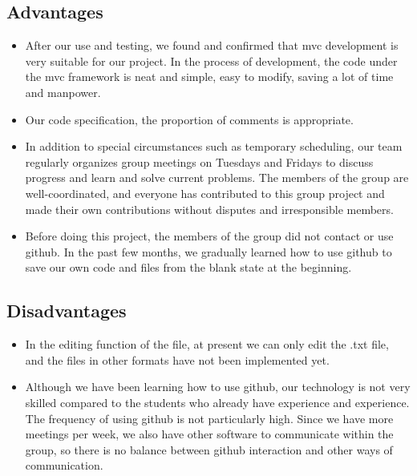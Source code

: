 \subsection{Advantages}
\begin{itemize}
    \item After our use and testing, we found and confirmed that mvc development is very suitable for our project. In the process of development, the code under the mvc framework is neat and simple, easy to modify, saving a lot of time and manpower.
    \item Our code specification, the proportion of comments is appropriate.
    \item In addition to special circumstances such as temporary scheduling, our team regularly organizes group meetings on Tuesdays and Fridays to discuss progress and learn and solve current problems. The members of the group are well-coordinated, and everyone has contributed to this group project and made their own contributions without disputes and irresponsible members.
    \item Before doing this project, the members of the group did not contact or use github. In the past few months, we gradually learned how to use github to save our own code and files from the blank state at the beginning.
    
\end{itemize}


\subsection{Disadvantages}
\begin{itemize}
    \item In the editing function of the file, at present we can only edit the .txt file, and the files in other formats have not been implemented yet.
    \item Although we have been learning how to use github, our technology is not very skilled compared to the students who already have experience and experience. The frequency of using github is not particularly high. Since we have more meetings per week, we also have other software to communicate within the group, so there is no balance between github interaction and other ways of communication.
\end{itemize}

